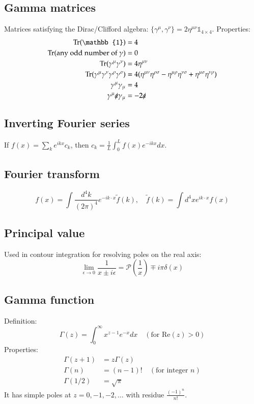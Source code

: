 \documentclass{article}
\begin{document}
\subsection{Gamma matrices}
Matrices satisfying the Dirac/Clifford algebra: $\{\gamma^\mu, \gamma^\nu\} = 2\eta^{\mu\nu}\mathbb{1}_{4\times 4}$.
Properties:
\begin{align}
    \text{Tr}(\mathbb{1}) &= 4 \\
    \text{Tr}(\text{any odd number of } \gamma) &= 0 \\
    \text{Tr}(\gamma^\mu \gamma^\nu) &= 4\eta^{\mu\nu} \\
    \text{Tr}(\gamma^\mu \gamma^\nu \gamma^\rho \gamma^\sigma) &= 4(\eta^{\mu\nu}\eta^{\rho\sigma} - \eta^{\mu\rho}\eta^{\nu\sigma} + \eta^{\mu\sigma}\eta^{\nu\rho}) \\
    \gamma^\mu \gamma_\mu &= 4 \\
    \gamma^\mu \slashed{a} \gamma_\mu &= -2\slashed{a}
\end{align}
\subsection{Inverting Fourier series}
If $f(x) = \sum_{k} e^{ikx} c_k$, then $c_k = \frac{1}{L} \int_0^L f(x) e^{-ikx} dx$.
\subsection{Fourier transform}
\begin{equation}
    f(x) = \int \frac{d^4k}{(2\pi)^4} e^{-ik\cdot x} \tilde{f}(k), \quad \tilde{f}(k) = \int d^4x e^{ik\cdot x} f(x)
\end{equation}
\subsection{Principal value}
Used in contour integration for resolving poles on the real axis:
\begin{equation}
    \lim_{\epsilon \to 0} \frac{1}{x \pm i\epsilon} = \mathcal{P}\left(\frac{1}{x}\right) \mp i\pi \delta(x)
\end{equation}
\subsection{Gamma function}
Definition:
\begin{equation}
    \Gamma(z) = \int_0^\infty x^{z-1} e^{-x} dx \quad (\text{for } \text{Re}(z) > 0)
\end{equation}
Properties:
\begin{align}
    \Gamma(z+1) &= z\Gamma(z) \\
    \Gamma(n) &= (n-1)! \quad (\text{for integer } n) \\
    \Gamma(1/2) &= \sqrt{\pi}
\end{align}
It has simple poles at $z = 0, -1, -2, \dots$ with residue $\frac{(-1)^n}{n!}$.
\end{document}
